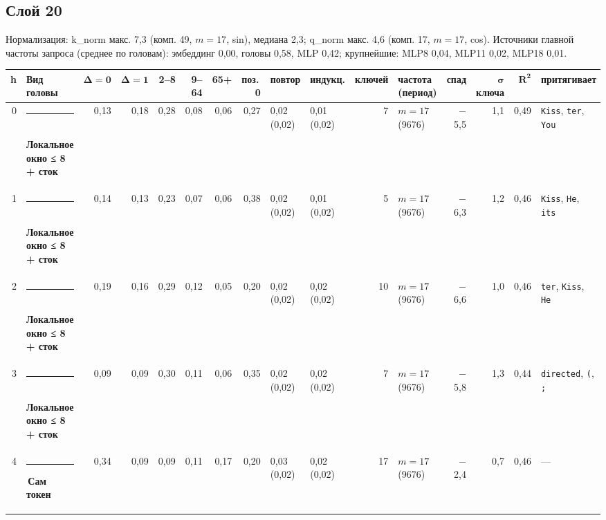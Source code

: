 \documentclass[10pt]{article}
\begin{document}
\noindent\begin{minipage}{\linewidth}
\subsection*{Слой 20}
{\small\color{ink2} Нормализация: k\_norm макс. 7,3 (комп. 49, $m{=}17$, sin), медиана 2,3; q\_norm макс. 4,6 (комп. 17, $m{=}17$, cos). Источники главной частоты запроса (среднее по головам): эмбеддинг 0,00, головы 0,58, MLP 0,42; крупнейшие: MLP8 0,04, MLP11 0,02, MLP18 0,01.}
\begin{center}{\footnotesize\begin{tabular}{|r|l|r|r|r|r|r|r|l|l|r|l|r|r|r|l|}
\hline
\rowcolor{head}\textbf{h} & \textbf{Вид головы} & $\boldsymbol{\Delta{=}0}$ & $\boldsymbol{\Delta{=}1}$ & \textbf{2–8} & \textbf{9–64} & \textbf{65+} & \textbf{поз.\,0} & \textbf{повтор} & \textbf{индукц.} & \textbf{ключей} & \textbf{частота (период)} & \textbf{спад} & $\boldsymbol{\sigma}$ \textbf{ключа} & $\boldsymbol{R^2}$ & \textbf{притягивает} \\ \hline
0 & \textcolor[HTML]{1BAF7A}{\rule{0.62em}{0.62em}}\,\textbf{Локальное окно ≤ 8 + сток} & 0,13 & 0,18 & 0,28 & 0,08 & 0,06 & 0,27 & 0,02 (0,02) & 0,01 (0,02) & 7 & $m{=}17$ (9676) & $-$5,5 & 1,1 & 0,49 & \texttt{\textvisiblespace{}Kiss}, \texttt{ter}, \texttt{\textvisiblespace{}You} \\ \hline
1 & \textcolor[HTML]{1BAF7A}{\rule{0.62em}{0.62em}}\,\textbf{Локальное окно ≤ 8 + сток} & 0,14 & 0,13 & 0,23 & 0,07 & 0,06 & 0,38 & 0,02 (0,02) & 0,01 (0,02) & 5 & $m{=}17$ (9676) & $-$6,3 & 1,2 & 0,46 & \texttt{\textvisiblespace{}Kiss}, \texttt{\textvisiblespace{}He}, \texttt{\textvisiblespace{}its} \\ \hline
2 & \textcolor[HTML]{1BAF7A}{\rule{0.62em}{0.62em}}\,\textbf{Локальное окно ≤ 8 + сток} & 0,19 & 0,16 & 0,29 & 0,12 & 0,05 & 0,20 & 0,02 (0,02) & 0,02 (0,02) & 10 & $m{=}17$ (9676) & $-$6,6 & 1,0 & 0,46 & \texttt{ter}, \texttt{\textvisiblespace{}Kiss}, \texttt{\textvisiblespace{}He} \\ \hline
3 & \textcolor[HTML]{1BAF7A}{\rule{0.62em}{0.62em}}\,\textbf{Локальное окно ≤ 8 + сток} & 0,09 & 0,09 & 0,30 & 0,11 & 0,06 & 0,35 & 0,02 (0,02) & 0,02 (0,02) & 7 & $m{=}17$ (9676) & $-$5,8 & 1,3 & 0,44 & \texttt{\textvisiblespace{}directed}, \texttt{\textvisiblespace{}(}, \texttt{\textvisiblespace{};} \\ \hline
4 & \textcolor[HTML]{2A78D6}{\rule{0.62em}{0.62em}}\,\textbf{Сам токен} & 0,34 & 0,09 & 0,09 & 0,11 & 0,17 & 0,20 & 0,03 (0,02) & 0,02 (0,02) & 17 & $m{=}17$ (9676) & $-$2,4 & 0,7 & 0,46 & — \\ \hline

\end{tabular}}
\end{center}
\end{minipage}
\end{document}
